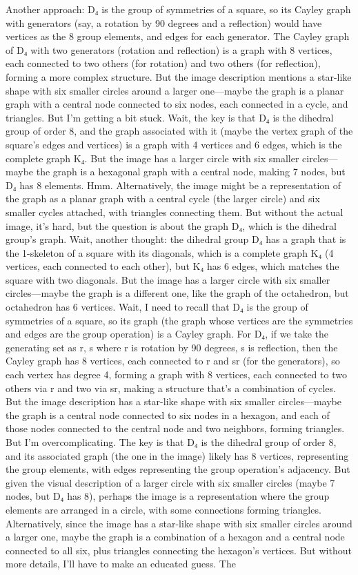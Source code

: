 Another approach: D₄ is the group of symmetries of a square, so its Cayley graph with generators (say, a rotation by 90 degrees and a reflection) would have vertices as the 8 group elements, and edges for each generator. The Cayley graph of D₄ with two generators (rotation and reflection) is a graph with 8 vertices, each connected to two others (for rotation) and two others (for reflection), forming a more complex structure. But the image description mentions a star-like shape with six smaller circles around a larger one—maybe the graph is a planar graph with a central node connected to six nodes, each connected in a cycle, and triangles. But I'm getting a bit stuck. Wait, the key is that D₄ is the dihedral group of order 8, and the graph associated with it (maybe the vertex graph of the square's edges and vertices) is a graph with 4 vertices and 6 edges, which is the complete graph K₄. But the image has a larger circle with six smaller circles—maybe the graph is a hexagonal graph with a central node, making 7 nodes, but D₄ has 8 elements. Hmm. Alternatively, the image might be a representation of the graph as a planar graph with a central cycle (the larger circle) and six smaller cycles attached, with triangles connecting them. But without the actual image, it's hard, but the question is about the graph D₄, which is the dihedral group's graph. Wait, another thought: the dihedral group D₄ has a graph that is the 1-skeleton of a square with its diagonals, which is a complete graph K₄ (4 vertices, each connected to each other), but K₄ has 6 edges, which matches the square with two diagonals. But the image has a larger circle with six smaller circles—maybe the graph is a different one, like the graph of the octahedron, but octahedron has 6 vertices. Wait, I need to recall that D₄ is the group of symmetries of a square, so its graph (the graph whose vertices are the symmetries and edges are the group operation) is a Cayley graph. For D₄, if we take the generating set as {r, s} where r is rotation by 90 degrees, s is reflection, then the Cayley graph has 8 vertices, each connected to r and sr (for the generators), so each vertex has degree 4, forming a graph with 8 vertices, each connected to two others via r and two via sr, making a structure that's a combination of cycles. But the image description has a star-like shape with six smaller circles—maybe the graph is a central node connected to six nodes in a hexagon, and each of those nodes connected to the central node and two neighbors, forming triangles. But I'm overcomplicating. The key is that D₄ is the dihedral group of order 8, and its associated graph (the one in the image) likely has 8 vertices, representing the group elements, with edges representing the group operation's adjacency. But given the visual description of a larger circle with six smaller circles (maybe 7 nodes, but D₄ has 8), perhaps the image is a representation where the group elements are arranged in a circle, with some connections forming triangles. Alternatively, since the image has a star-like shape with six smaller circles around a larger one, maybe the graph is a combination of a hexagon and a central node connected to all six, plus triangles connecting the hexagon's vertices. But without more details, I'll have to make an educated guess. The 